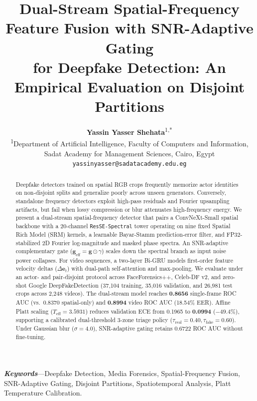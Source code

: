 \documentclass[10pt,twocolumn,letterpaper]{article}
\title{\textbf{\Large Dual-Stream Spatial-Frequency Feature Fusion with SNR-Adaptive Gating\\for Deepfake Detection: An Empirical Evaluation on Disjoint Partitions}}
\author{
  \textbf{Yassin Yasser Shehata}\textsuperscript{1,*} \\[1.0ex]
  \textsuperscript{1}Department of Artificial Intelligence, Faculty of Computers and Information, \\
  Sadat Academy for Management Sciences, Cairo, Egypt \\
  \texttt{yassinyasser@sadatacademy.edu.eg}
}
\date{}
\begin{document}
\maketitle
\def\thefootnote{*}\def\thefootnote{\arabic{footnote}}

\begin{abstract}
Deepfake detectors trained on spatial RGB crops frequently memorize actor identities on non-disjoint splits and generalize poorly across unseen generators. Conversely, standalone frequency detectors exploit high-pass residuals and Fourier upsampling artifacts, but fail when lossy compression or blur attenuates high-frequency energy. We present a dual-stream spatial-frequency detector that pairs a ConvNeXt-Small spatial backbone with a 20-channel \texttt{ResSE-Spectral} tower operating on nine fixed Spatial Rich Model (SRM) kernels, a learnable Bayar-Stamm prediction-error filter, and FP32-stabilized 2D Fourier log-magnitude and masked phase spectra. An SNR-adaptive complementary gate ($\mathbf{g}_{\mathrm{eff}} = \mathbf{g} \odot \gamma$) scales down the spectral branch as input noise power collapses. For video sequences, a two-layer Bi-GRU models first-order feature velocity deltas ($\Delta \mathbf{e}_t$) with dual-path self-attention and max-pooling. We evaluate under an actor- and pair-disjoint protocol across FaceForensics++, Celeb-DF v2, and zero-shot Google DeepFakeDetection (37,104 training, 35,016 validation, and 26,981 test crops across 2,248 videos). The dual-stream model reaches \textbf{0.8656} single-frame ROC AUC (vs.\ 0.8370 spatial-only) and \textbf{0.8994} video ROC AUC (18.54\% EER). Affine Platt scaling ($T_{\mathrm{eff}} = 3.5931$) reduces validation ECE from 0.1965 to \textbf{0.0994} ($-49.4\%$), supporting a calibrated dual-threshold 3-zone triage policy ($\tau_{\mathrm{real}} = 0.40, \tau_{\mathrm{fake}} = 0.60$). Under Gaussian blur ($\sigma = 4.0$), SNR-adaptive gating retains 0.6722 ROC AUC without fine-tuning.
\end{abstract}

\textbf{\textit{Keywords}}---Deepfake Detection, Media Forensics, Spatial-Frequency Fusion, SNR-Adaptive Gating, Disjoint Partitions, Spatiotemporal Analysis, Platt Temperature Calibration.
\end{document}
